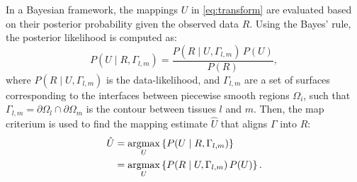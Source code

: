 In a Bayesian framework, the mappings $U$ in \autoref{eq:transform} are
  evaluated based on their posterior probability given the observed data
  $R$.
Using the Bayes' rule, the posterior likelihood is computed as:
  \begin{equation}
  P(U \mid R,\Gamma_{l,m}) = \frac{P(R \mid U,\Gamma_{l,m})\, P(U)}{P(R)},
  \label{eq:bayes_rule}
  \end{equation}
  where $P(R \mid U,\Gamma_{l,m})$ is the data-likelihood, and
  $\Gamma_{l,m}$ are a set of surfaces corresponding to the interfaces
  between piecewise smooth regions $\Omega_i$, such that
  $\Gamma_{l,m} = \partial \Omega_l \cap \partial \Omega_m$ is the
  contour between tissues $l$ and $m$.
Then, the \gls*{map} criterium \citep{leemput_automated_1999} is used
  to find the mapping estimate $\hat{U}$ that aligns $\Gamma$ into $R$:
  \begin{align}
  \hat{U} &= \underset{U}{\operatorname{argmax}} \left\{ P(U \mid R,\Gamma_{l,m}) \right\} \notag\\
   &= \underset{U}{\operatorname{argmax}} \left\{ P(R \mid U,\Gamma_{l,m})\, P(U) \right\}.
  \label{eq:map_u}
  \end{align}

